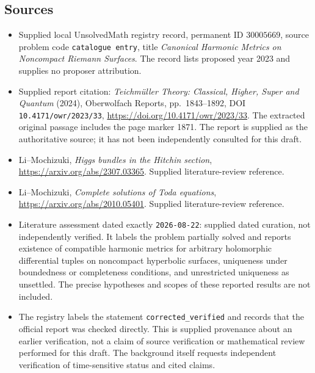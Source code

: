 \documentclass[11pt]{article}
\begin{document}
\subsection{Sources}
\begin{itemize}
\item Supplied local UnsolvedMath registry record, permanent ID \(30005669\), source problem code \texttt{catalogue entry}, title \emph{Canonical Harmonic Metrics on Noncompact Riemann Surfaces}. The record lists proposed year 2023 and supplies no proposer attribution.
\item Supplied report citation: \emph{Teichm\"uller Theory: Classical, Higher, Super and Quantum} (2024), Oberwolfach Reports, pp.~1843--1892, DOI \texttt{10.4171/owr/2023/33}, \url{https://doi.org/10.4171/owr/2023/33}. The extracted original passage includes the page marker 1871. The report is supplied as the authoritative source; it has not been independently consulted for this draft.
\item Li--Mochizuki, \emph{Higgs bundles in the Hitchin section}, \url{https://arxiv.org/abs/2307.03365}. Supplied literature-review reference.
\item Li--Mochizuki, \emph{Complete solutions of Toda equations}, \url{https://arxiv.org/abs/2010.05401}. Supplied literature-review reference.
\item Literature assessment dated exactly \texttt{2026-08-22}: supplied dated curation, not independently verified. It labels the problem partially solved and reports existence of compatible harmonic metrics for arbitrary holomorphic differential tuples on noncompact hyperbolic surfaces, uniqueness under boundedness or completeness conditions, and unrestricted uniqueness as unsettled. The precise hypotheses and scopes of these reported results are not included.
\item The registry labels the statement \texttt{corrected\_verified} and records that the official report was checked directly. This is supplied provenance about an earlier verification, not a claim of source verification or mathematical review performed for this draft. The background itself requests independent verification of time-sensitive status and cited claims.
\end{itemize}
\end{document}
